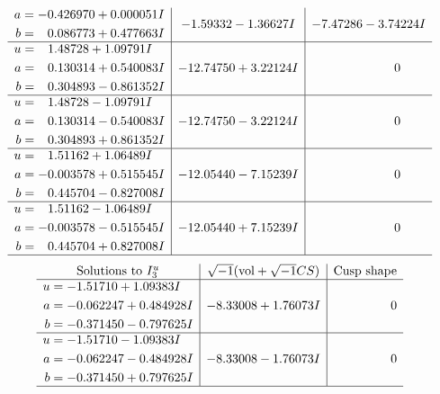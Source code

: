 \documentclass[1p]{elsarticle_modified}
\theoremstyle{definition}
\newcommand{\I}{\sqrt{-1}}
\begin{document}
$$\begin{array}{c|c|c}
\begin{aligned}
a &= -0.426970 + 0.000051 I \\
b &= \phantom{-}0.086773 + 0.477663 I\end{aligned}
 & -1.59332 - 1.36627 I & -7.47286 - 3.74224 I \\ \hline\begin{aligned}
u &= \phantom{-}1.48728 + 1.09791 I \\
a &= \phantom{-}0.130314 + 0.540083 I \\
b &= \phantom{-}0.304893 - 0.861352 I\end{aligned}
 & -12.74750 + 3.22124 I & \phantom{-0.000000 } 0 \\ \hline\begin{aligned}
u &= \phantom{-}1.48728 - 1.09791 I \\
a &= \phantom{-}0.130314 - 0.540083 I \\
b &= \phantom{-}0.304893 + 0.861352 I\end{aligned}
 & -12.74750 - 3.22124 I & \phantom{-0.000000 } 0 \\ \hline\begin{aligned}
u &= \phantom{-}1.51162 + 1.06489 I \\
a &= -0.003578 + 0.515545 I \\
b &= \phantom{-}0.445704 - 0.827008 I\end{aligned}
 & -12.05440 - 7.15239 I & \phantom{-0.000000 } 0 \\ \hline\begin{aligned}
u &= \phantom{-}1.51162 - 1.06489 I \\
a &= -0.003578 - 0.515545 I \\
b &= \phantom{-}0.445704 + 0.827008 I\end{aligned}
 & -12.05440 + 7.15239 I & \phantom{-0.000000 } 0\\
 \hline 
 \end{array}$$\newpage$$\begin{array}{c|c|c}  
\text{Solutions to }I^u_{3}& \I (\text{vol} + \sqrt{-1}CS) & \text{Cusp shape}\\
 \hline 
\begin{aligned}
u &= -1.51710 + 1.09383 I \\
a &= -0.062247 + 0.484928 I \\
b &= -0.371450 - 0.797625 I\end{aligned}
 & -8.33008 + 1.76073 I & \phantom{-0.000000 } 0 \\ \hline\begin{aligned}
u &= -1.51710 - 1.09383 I \\
a &= -0.062247 - 0.484928 I \\
b &= -0.371450 + 0.797625 I\end{aligned}
 & -8.33008 - 1.76073 I & \phantom{-0.000000 } 0\\
 \hline 
 \end{array}$$\newpage\newpage\renewcommand{\arraystretch}{1}
\end{document}
